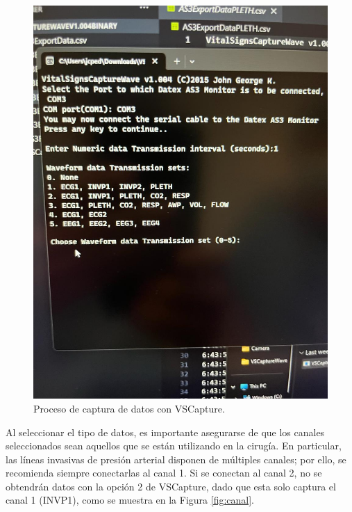 \documentclass{article}
\begin{document}
\begin{figure}[h]
	\centering
	\includegraphics[scale=0.2]{img/vs_capture.png}
	\caption{Proceso de captura de datos con VSCapture.}
	\label{fig:vs_capture}
\end{figure}



Al seleccionar el tipo de datos, es importante asegurarse de que los canales seleccionados sean aquellos que se están utilizando en la cirugía. En particular, las líneas invasivas de presión arterial disponen de múltiples canales; por ello, se recomienda siempre conectarlas al canal 1. Si se conectan al canal 2, no se obtendrán datos con la opción 2 de VSCapture, dado que esta solo captura el canal 1 (INVP1), como se muestra en la Figura \ref{fig:canal}.
\end{document}

